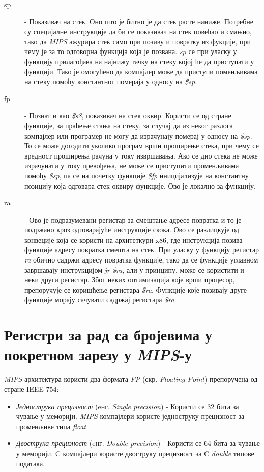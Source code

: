 \documentclass[12pt,oneside]{memoir}
\begin{document}
\begin{description}
  \item[sp] - Показивач на стек. Оно што је битно је да стек расте наниже. Потребне су специјалне инструкције да би се показивач на стек повећао и смањио, тако да \textit{MIPS} ажурира стек само при позиву и повратку из фукције, при чему је за то одговорна функција која је позвана. \textit{sp} се при уласку у функцију прилагођава на најнижу тачку на стеку којој ће да приступати у функцији. Тако је омогућено да компајлер може да приступи поменљивама на стеку помоћу константног помераја у односу на \textit{\$sp}.
  \item[fp] - Познат и као \textit{\$s8}, показивач на стек оквир. Користи се од стране функције, за праћење стања на стеку, за случај да из неког разлога компајлер или програмер не могу да израчунају померај у односу на \textit{\$sp}. То се може догодити уколико програм врши проширење стека, при чему се вредност проширења рачуна у току извршавања. Ако се дно стека не може израчунати у току превођења, не може се приступити променљивама помоћу \textit{\$sp}, па се на почетку функције \textit{\$fp} иницијализује на константну позицију која одговара стек оквиру функције. Ово је локално за функцију.
  \item[ra] - Ово је подразумевани регистар за смештање адресе повратка и то је подржано кроз одговарајуће инструкције скока. Ово се разлицкује од конвеције која се користи на архитеткури x86, где инструкција позива функције адресу повратка смешта на стек. При уласку у функцију регистар \textit{ra} обично садржи адресу повратка функције, тако да се функције углавном завршавају инструкцијом \textit{jr \$ra}, али у принципу, може се користити и неки други регистар. Због неких оптимизација које врши процесор, препоручује се коришћење регистара \textit{\$ra}. Функције које позивају друге функције морају сачувати садржај регистара \textit{\$ra}.
\end{description}


\section{Регистри за рад са бројевима у покретном зарезу у \textit{MIPS}-у}
\label{fp_registri}

\textit{MIPS} архитектура користи два формата \textit{FP} (скр. \textit{Floating Point}) препоручена од стране IEEE 754:

\begin{itemize}
	\item \textit{Једнострука прецизност} (eнг. \textit{Single precision}) - Користи се 32 бита за чување у меморији. \textit{MIPS} компајлери користе једноструку прецизност за променљиве типа \textit{float}
	\item \textit{Двострука прецизност} (eнг. \textit{Double precision}) - Користи се 64 бита за чување у меморији. C компајлери користе двоструку прецизност за C \textit{double} типове података.
\end{itemize}
\end{document}
